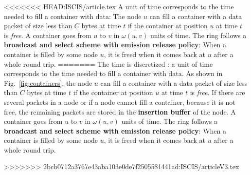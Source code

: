 \documentclass[10pt, conference, letterpaper]{IEEEtran}
\begin{document}
<<<<<<< HEAD:ISCIS/article.tex
  A unit of time corresponds to the time needed to fill a container with data:
  The node $u$ can fill a container with a data packet of size less than $C$ bytes at time $t$ if the container 
  at position $u$ at time $t$ is \emph{free}. A container goes from $u$ to $v$ in $\omega(u,v)$ units of time. The ring follows a {\bf broadcast and select scheme with emission release policy}: When a container is filled by some node $u$, it is freed when it comes back at $u$ after a whole round trip.
=======
  The time is discretized : a unit of time corresponds to the time needed to fill a container with data.
  As shown in Fig.~\ref{fig:containers}, the node $u$ can fill a container with a data packet of size less than $C$ bytes at time $t$ if the container 
  at position $u$ at time $t$ is \emph{free}. 
  If there are several packets in a node or if a node cannot fill a container, because it is not free, 
  the remaining packets are stored in the {\bf insertion buffer} of the node. 
  A container goes from $u$ to $v$ in $\omega(u,v)$ units of time. The ring follows a {\bf broadcast and select scheme with emission release policy}: When a container is filled by some node $u$, it is freed when it comes back at $u$ after a whole round trip.
   
>>>>>>> 2bcb0712a3767e43aba103e0de7f2505581441ad:ISCIS/articleV3.tex
  
\end{document}
